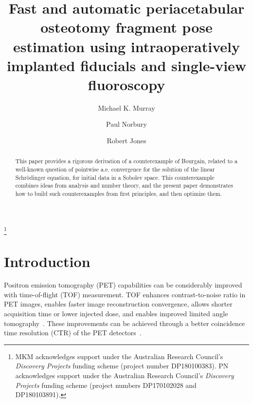 \documentclass[demo]{OUP-EJ}
\begin{document}
\title[Short Article title]{Fast and automatic periacetabular osteotomy fragment pose estimation using intraoperatively implanted fiducials and single-view fluoroscopy}

\author[1,3,*]{Michael K. Murray}

\author[2,**]{Paul Norbury}

\author[3,\S]{Robert Jones}








\begin{abstract}
This paper provides a rigorous derivation of a counterexample of Bourgain, related to a well-known question of pointwise a.e. convergence for the solution of the linear Schr\"odinger equation, for initial data in a Sobolev space. This counterexample combines ideas from analysis and number theory, and the present paper demonstrates how to build such counterexamples from first principles, and then optimize them.
\end{abstract}


\dedication{Dedicated to the memory of Sir Michael Atiyah}

\thanks{MKM acknowledges support under the  Australian
Research Council's {\sl Discovery Projects} funding scheme (project number DP180100383).  PN acknowledges support under the  Australian
Research Council's {\sl Discovery Projects} funding scheme (project numbers DP170102028 and DP180103891).
}



\maketitle


\section{Introduction}\label{isect1}
Positron emission tomography (PET) capabilities can be considerably improved with time-of-flight (TOF) measurement.
TOF enhances contrast-to-noise ratio in PET images, enables faster image reconstruction convergence, allows shorter acquisition time or lower injected dose, and enables improved limited angle tomography~\citep{Karp2008,Vandenberghe2016,Lecoq2017}.
These improvements can be achieved through a better coincidence time resolution (CTR) of the PET detectors~\citep{Conti2011}.
\end{document}

